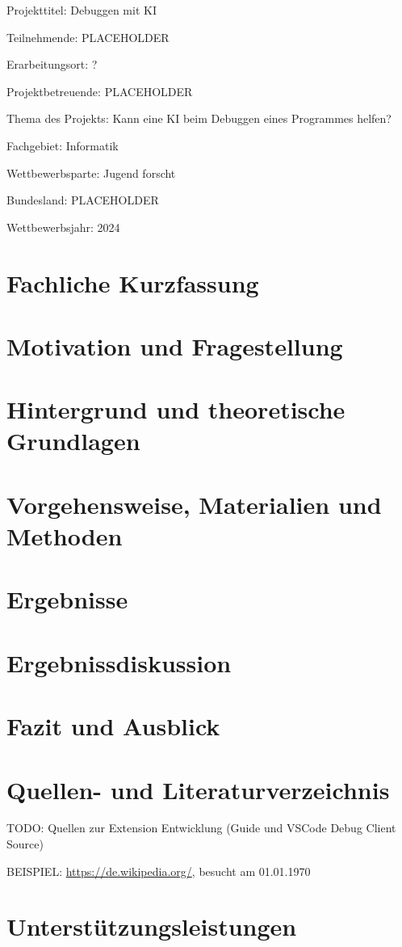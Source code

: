 \documentclass[a4paper,12pt,ngerman]{scrartcl}
\begin{document}
\begin{titlepage}
	Projekttitel: Debuggen mit KI
	\vspace{1cm}
	
	Teilnehmende: PLACEHOLDER
	
	Erarbeitungsort: ?
	
	Projektbetreuende: PLACEHOLDER
	
	Thema des Projekts: Kann eine KI beim Debuggen eines Programmes helfen?
	
	Fachgebiet: Informatik
	
	Wettbewerbsparte: Jugend forscht
	
	Bundesland: PLACEHOLDER
	
	Wettbewerbsjahr: 2024
	
	\vspace{2cm}
	\vfill
\end{titlepage}
\clearpage
{\normalfont\tableofcontents}
\clearpage

\section{Fachliche Kurzfassung}

\section{Motivation und Fragestellung}

\section{Hintergrund und theoretische Grundlagen}

\section{Vorgehensweise, Materialien und Methoden}

\section{Ergebnisse}

\section{Ergebnissdiskussion}

\section{Fazit und Ausblick}

\section{Quellen- und Literaturverzeichnis}

TODO: Quellen zur Extension Entwicklung (Guide und VSCode Debug Client Source)

BEISPIEL: \url{https://de.wikipedia.org/}, besucht am 01.01.1970

\section{Unterstützungsleistungen}
\end{document}
